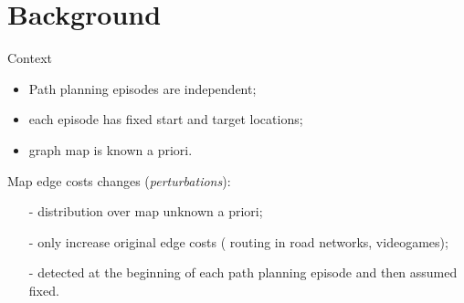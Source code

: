 \section*{Background}

\begin{frame}{Context}
    \begin{itemize}
        \item Path planning episodes are independent;
        \item each episode has fixed start and target locations;
        \item graph map is known a priori.
    \end{itemize}
    
    \medskip
    Map edge costs changes (\textit{perturbations}):
    \begin{itemize}
        \item[-] distribution over map unknown a priori;
        \item[-] only increase original edge costs (\eg{} routing in road networks, videogames);
        \item[-] detected at the beginning of each path planning episode and then assumed fixed.
    \end{itemize}
\end{frame}

